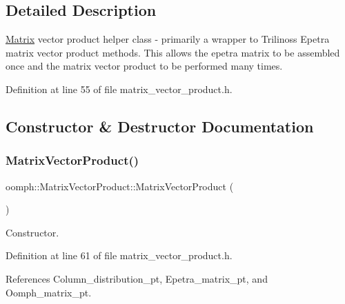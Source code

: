 \subsection{Detailed Description}
\hyperlink{classoomph_1_1Matrix}{Matrix} vector product helper class -\/ primarily a wrapper to Trilinos\textquotesingle{}s Epetra matrix vector product methods. This allows the epetra matrix to be assembled once and the matrix vector product to be performed many times. 

Definition at line 55 of file matrix\+\_\+vector\+\_\+product.\+h.



\subsection{Constructor \& Destructor Documentation}
\mbox{\label{classoomph_1_1MatrixVectorProduct_af0c48ee8ae2ae94b5f3f38a8071c22f9}} 
\subsubsection{\texorpdfstring{Matrix\+Vector\+Product()}{MatrixVectorProduct()}\hspace{0.1cm}{\footnotesize\ttfamily [1/2]}}
{\footnotesize\ttfamily oomph\+::\+Matrix\+Vector\+Product\+::\+Matrix\+Vector\+Product (\begin{DoxyParamCaption}{ }\end{DoxyParamCaption})\hspace{0.3cm}{\ttfamily [inline]}}



Constructor. 



Definition at line 61 of file matrix\+\_\+vector\+\_\+product.\+h.



References Column\+\_\+distribution\+\_\+pt, Epetra\+\_\+matrix\+\_\+pt, and Oomph\+\_\+matrix\+\_\+pt.

\mbox{\label{classoomph_1_1MatrixVectorProduct_a011af8826e958fb575f36360e6267ace}} 
